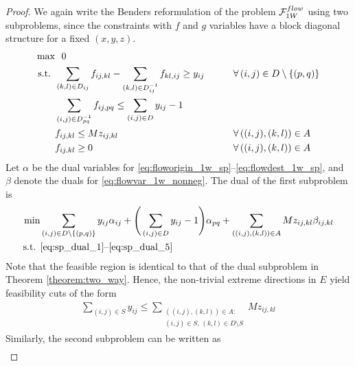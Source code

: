 \documentclass[10pt,a4paper]{amsart}
\newcommand{\countvar}[4]{z_{#1#2,#3#4}}
\newcommand{\drivevar}[2]{y_{#1#2}}
\newcommand{\entrancex}{p}
\newcommand{\entrancey}{q}
\newcommand{\flowvar}[4]{f_{#1#2,#3#4}}
\newcommand{\gridadjset}[2]{D_{#1#2}}
\newcommand{\gridarcset}{A}
\newcommand{\gridinvadjset}[2]{D^{-1}_{#1#2}}
\newcommand{\validdriveset}{D}
\begin{document}
\begin{proof}
We again write the Benders reformulation of the problem $\mathcal{F}_{\textsc{1W}}^{\textsc{flow}}$ using two subproblems, since the constraints with $f$ and $g$ variables have a block diagonal structure for a fixed $(x, y, z)$. 
\begin{align}
    \max & \, \, \, \, 0  && \notag \\
      \text{s.t. }  & \sum_{(k,l) \in \gridadjset{i}{j}} \flowvar{i}{j}{k}{l} - \sum_{(k,l) \in \gridinvadjset{i}{j}} \flowvar{k}{l}{i}{j} \geq \drivevar{i}{j} \qquad && \forall \, (i,j) \in \validdriveset \setminus \{(\entrancex, \entrancey)\} \label{eq:floworigin_1w_sp}\\
     & \sum_{(i,j) \in \gridinvadjset{\entrancex}{\entrancey}} \flowvar{i}{j}{\entrancex}{\entrancey} \leq \sum_{(i,j) \in \validdriveset} \drivevar{i}{j} -1 \qquad &&  \label{eq:flowdest_1w_sp}\\
    & \flowvar{i}{j}{k}{l} \leq M \countvar{i}{j}{k}{l} \qquad && \forall \, ((i,j), (k,l)) \in \gridarcset \label{eq:flowhead_1w_sp} \\
    & \flowvar{i}{j}{k}{l} \geq 0 \qquad && \forall \, ((i,j), (k,l)) \in \gridarcset \label{eq:flowvar_1w_nonneg}
\end{align}
Let $\alpha$ be the dual variables for \eqref{eq:floworigin_1w_sp}--\eqref{eq:flowdest_1w_sp}, and $\beta$ denote the duals for \eqref{eq:flowvar_1w_nonneg}. The dual of the first subproblem is
\begin{align}
    \min & \sum_{(i,j) \in \validdriveset \setminus \{(\entrancex, \entrancey)\}} \drivevar{i}{j} \alpha_{ij} + \Bigg(\sum_{(i,j) \in \validdriveset} \drivevar{i}{j} -1 \Bigg) \alpha_{pq} + \sum_{((i,j), (k,l)) \in \gridarcset}  M \countvar{i}{j}{k}{l} \beta_{ij, kl}  \\
    \text{s.t. } & \eqref{eq:sp_dual_1} \text{--} \eqref{eq:sp_dual_5}
\end{align}
Note that the feasible region is identical to that of the dual subproblem in Theorem \ref{theorem:two_way}. Hence, the non-trivial extreme directions in $E$ yield feasibility cuts of the form
\begin{align}
\sum_{(i,j) \in S} \drivevar{i}{j} \leq  \sum_{\substack{
  ((i,j),(k,l)) \in \gridarcset:\\
  (i,j) \in S,\,
  (k,l) \in D \setminus S
}} M \countvar{i}{j}{k}{l}  \label{eq:simplified_cut_1w_a}
\end{align}
Similarly, the second subproblem can be written as 
\begin{align}

\end{align}
\end{proof}
\end{document}
